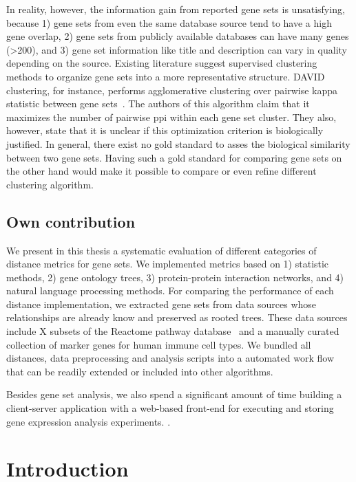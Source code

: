 \documentclass{thesisclass}
\begin{document}
In reality, however, the information gain from reported gene sets is unsatisfying, because 
1) gene sets from even the same database source tend to have a high gene overlap, 
2) gene sets from publicly available databases can have many genes (>200), and 
3) gene set information like title and description can vary in quality depending on the source.
Existing literature suggest supervised clustering methods to organize gene sets into a more representative structure.  DAVID clustering, for instance, performs agglomerative clustering over pairwise kappa statistic between gene sets~\cite{Huang2007}. The authors of this algorithm claim that it maximizes the number of pairwise \acrfull{ppi} within each gene set cluster. They also, however, state that it is unclear if this optimization criterion is biologically justified. In general, there exist no gold standard to asses the biological similarity between two gene sets. Having such a gold standard for comparing gene sets on the other hand would make it possible to compare or even refine different clustering algorithm.

\section{Own contribution}

We present in this thesis a systematic evaluation of different categories of distance metrics for gene sets. We implemented metrics based on 1) statistic methods, 2) gene ontology trees, 3) protein-protein interaction networks, and 4) natural language processing methods. For comparing the performance of each distance implementation, we extracted gene sets from data sources whose relationships are already know and preserved as rooted trees. These data sources include X subsets of the Reactome pathway database~\cite{doi:10.1093/nar/gki072} and a manually curated collection of marker genes for human immune cell types. We bundled all distances, data preprocessing and analysis scripts into a automated work flow that can be readily extended or included into other algorithms.

Besides gene set analysis, we also spend a significant amount of time building a client-server application with a web-based front-end for executing and storing gene expression analysis experiments. .

\chapter{Introduction}
\label{ch:introduction}
\end{document}
